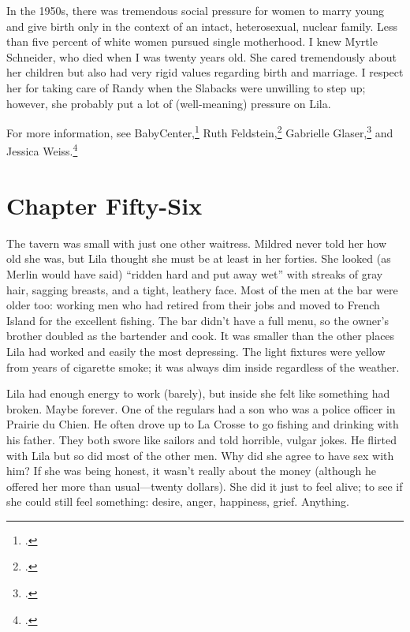 \documentclass[
  american,
  letterpaper,
]{book}
\begin{document}
In the 1950s, there was tremendous social pressure for women to marry
young and give birth only in the context of an intact, heterosexual,
nuclear family. Less than five percent of white women pursued single
motherhood. I knew Myrtle Schneider, who died when I was twenty years
old. She cared tremendously about her children but also had very rigid
values regarding birth and marriage. I respect her for taking care of
Randy when the Slabacks were unwilling to step up; however, she probably
put a lot of (well-meaning) pressure on Lila.

For more information, see BabyCenter,\footnote{.}
Ruth Feldstein,\footnote{.} Gabrielle
Glaser,\footnote{.} and Jessica Weiss.\footnote{.}


\chapter{Chapter Fifty-Six}\label{chapter-fifty-six}

The tavern was small with just one other waitress. Mildred never told
her how old she was, but Lila thought she must be at least in her
forties. She looked (as Merlin would have said) ``ridden hard and put
away wet'' with streaks of gray hair, sagging breasts, and a tight,
leathery face. Most of the men at the bar were older too: working men
who had retired from their jobs and moved to French Island for the
excellent fishing. The bar didn't have a full menu, so the owner's
brother doubled as the bartender and cook. It was smaller than the other
places Lila had worked and easily the most depressing. The light
fixtures were yellow from years of cigarette smoke; it was always dim
inside regardless of the weather.

Lila had enough energy to work (barely), but inside she felt like
something had broken. Maybe forever. One of the regulars had a son who
was a police officer in Prairie du Chien. He often drove up to La Crosse
to go fishing and drinking with his father. They both swore like sailors
and told horrible, vulgar jokes. He flirted with Lila but so did most of
the other men. Why did she agree to have sex with him? If she was being
honest, it wasn't really about the money (although he offered her more
than usual---twenty dollars). She did it just to feel alive; to see if
she could still feel something: desire, anger, happiness, grief.
Anything.
\end{document}
